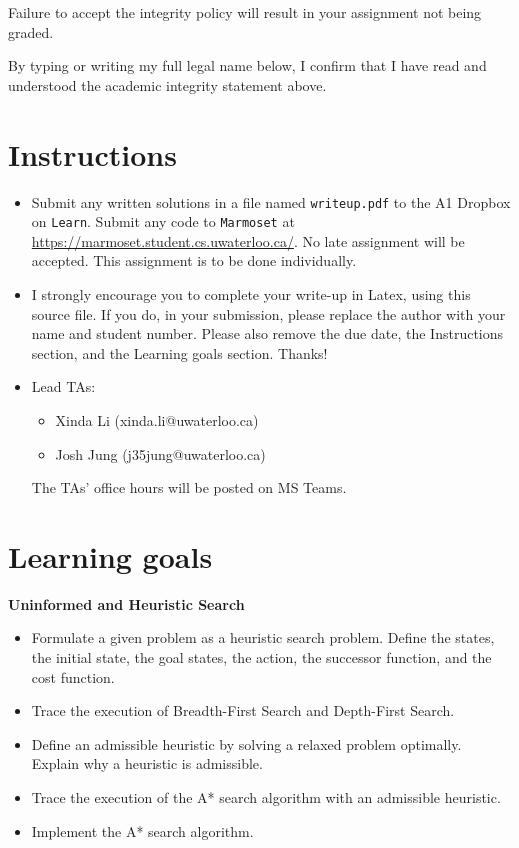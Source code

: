 \documentclass[12pt]{article}
\begin{document}
Failure to accept the integrity policy will result in your assignment not being graded.

By typing or writing my full legal name below, I confirm that I have read and understood the academic integrity statement above.


\newpage
\section*{Instructions}

\begin{itemize}
\item
Submit any written solutions in a file named \verb+writeup.pdf+ to the A1 Dropbox on \verb+Learn+. Submit any code to \verb+Marmoset+ at \url{https://marmoset.student.cs.uwaterloo.ca/}. 
No late assignment will be accepted. This assignment is to be done individually.

\item 
I strongly encourage you to complete your write-up in Latex, using this source file. If you do, in your submission, please replace the author with your name and student number. Please also remove the due date, the Instructions section, and the Learning goals section. Thanks!

\item
Lead TAs: 
\begin{itemize}
\item
Xinda Li (xinda.li@uwaterloo.ca)
\item 
Josh Jung (j35jung@uwaterloo.ca)
\end{itemize}
The TAs' office hours will be posted on MS Teams.
\end{itemize}



\section*{Learning goals}

{\bf Uninformed and Heuristic Search}
\begin{itemize}
\item Formulate a given problem as a heuristic search problem. Define the states, the initial state, the goal states, the action, the successor function, and the cost function.
\item Trace the execution of Breadth-First Search and Depth-First Search.
\item Define an admissible heuristic by solving a relaxed problem optimally. Explain why a heuristic is admissible.
\item Trace the execution of the A* search algorithm with an admissible heuristic.
\item Implement the A* search algorithm.
\end{itemize}
\end{document}
